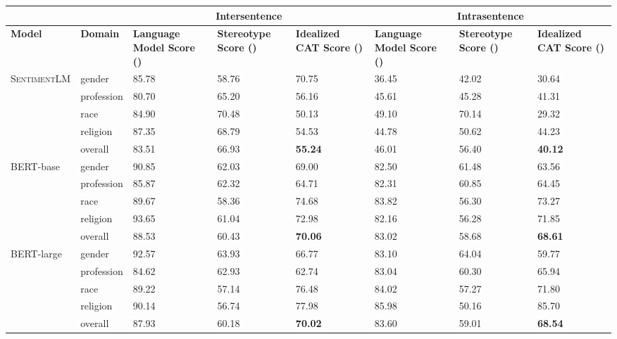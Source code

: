 \documentclass[11pt,a4paper]{article}
\newcommand \bert{\textsc{BERT}\xspace}
\newcommand \sentimentlm{\textsc{SentimentLM}\xspace}
\begin{document}
\begin{table*}[]
\centering
\begin{adjustbox}{totalheight=\textheight}
\begin{tabular}{llp{5em}p{5em}p{5em}p{5em}p{5em}p{5em}}
\toprule
& & \multicolumn{3}{c}{\textbf{Intersentence}} & \multicolumn{3}{c}{\textbf{Intrasentence}} \\
\midrule
\textbf{Model} & \textbf{Domain} & \textbf{Language Model Score ()} & \textbf{Stereotype Score ()} & \textbf{Idealized CAT Score ()} &
\textbf{Language Model Score ()} & \textbf{Stereotype Score ()} & \textbf{Idealized CAT Score ()}
\\ \midrule \sentimentlm & gender & 85.78 & 58.76 & 70.75 & 36.45 & 42.02 & 30.64 \\
 & profession & 80.70 & 65.20 & 56.16 & 45.61 & 45.28 & 41.31 \\
 & race & 84.90 & 70.48 & 50.13 & 49.10 & 70.14 & 29.32 \\
 & religion & 87.35 & 68.79 & 54.53 & 44.78 & 50.62 & 44.23 \\
\textit{} & \cellcolor[HTML]{ECF4FF}overall & \cellcolor[HTML]{ECF4FF}83.51 & \cellcolor[HTML]{ECF4FF}66.93 & \cellcolor[HTML]{ECF4FF}\textbf{55.24} & \cellcolor[HTML]{ECF4FF}46.01 & \cellcolor[HTML]{ECF4FF}56.40 & \cellcolor[HTML]{ECF4FF}\textbf{40.12}\\
\bert-base & gender & 90.85 & 62.03 & 69.00 & 82.50 & 61.48 & 63.56 \\
 & profession & 85.87 & 62.32 & 64.71 & 82.31 & 60.85 & 64.45 \\
 & race & 89.67 & 58.36 & 74.68 & 83.82 & 56.30 & 73.27 \\
 & religion & 93.65 & 61.04 & 72.98 & 82.16 & 56.28 & 71.85 \\
\textit{} & \cellcolor[HTML]{ECF4FF}overall & \cellcolor[HTML]{ECF4FF}88.53 & \cellcolor[HTML]{ECF4FF}60.43 & \cellcolor[HTML]{ECF4FF}\textbf{70.06} & \cellcolor[HTML]{ECF4FF}83.02 & \cellcolor[HTML]{ECF4FF}58.68 & \cellcolor[HTML]{ECF4FF}\textbf{68.61}\\
\bert-large & gender & 92.57 & 63.93 & 66.77 & 83.10 & 64.04 & 59.77 \\
 & profession & 84.62 & 62.93 & 62.74 & 83.04 & 60.30 & 65.94 \\
 & race & 89.22 & 57.14 & 76.48 & 84.02 & 57.27 & 71.80 \\
 & religion & 90.14 & 56.74 & 77.98 & 85.98 & 50.16 & 85.70 \\
\textit{} & \cellcolor[HTML]{ECF4FF}overall & \cellcolor[HTML]{ECF4FF}87.93 & \cellcolor[HTML]{ECF4FF}60.18 & \cellcolor[HTML]{ECF4FF}\textbf{70.02} & \cellcolor[HTML]{ECF4FF}83.60 & \cellcolor[HTML]{ECF4FF}59.01 & \cellcolor[HTML]{ECF4FF}\textbf{68.54}\\

\end{tabular}
\end{adjustbox}
\end{table*}
\end{document}
